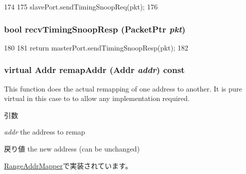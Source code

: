 \begin{DoxyCode}
174 {
175     slavePort.sendTimingSnoopReq(pkt);
176 }
\end{DoxyCode}
\hypertarget{classAddrMapper_a9b643d565edc21dac11ce15a560238a7}{
\subsubsection[{recvTimingSnoopResp}]{\setlength{\rightskip}{0pt plus 5cm}bool recvTimingSnoopResp ({\bf PacketPtr} {\em pkt})}}
\label{classAddrMapper_a9b643d565edc21dac11ce15a560238a7}



\begin{DoxyCode}
180 {
181     return masterPort.sendTimingSnoopResp(pkt);
182 }
\end{DoxyCode}
\hypertarget{classAddrMapper_a07fe2c0e12fc8be8a245306df09f1b2d}{
\subsubsection[{remapAddr}]{\setlength{\rightskip}{0pt plus 5cm}virtual {\bf Addr} remapAddr ({\bf Addr} {\em addr}) const}}
\label{classAddrMapper_a07fe2c0e12fc8be8a245306df09f1b2d}
This function does the actual remapping of one address to another. It is pure virtual in this case to to allow any implementation required. 
\begin{DoxyParams}{引数}
\item[{\em addr}]the address to remap \end{DoxyParams}
\begin{DoxyReturn}{戻り値}
the new address (can be unchanged) 
\end{DoxyReturn}


\hyperlink{classRangeAddrMapper_a0991da7dcb180722b611eb4a58a397a6}{RangeAddrMapper}で実装されています。

